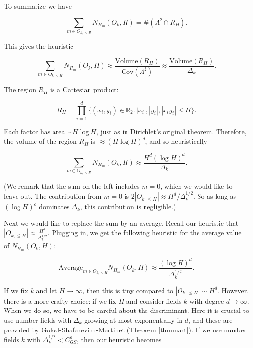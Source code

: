 \documentclass{amsart}
\newcommand{\RR}{\mathbb{R}}
\newcommand{\heur}{\approx}
\newcommand{\Average}{\textrm{Average}}
\newcommand{\Volume}{\textrm{Volume}}
\newcommand{\Cov}{\textrm{Cov}}
\begin{document}
To summarize we have

\begin{equation} \label{useRH}
\sum_{m \in O_{k, \le H} } N_{H_m}(O_k, H) = \# (\Lambda^2 \cap R_H).
\end{equation}

This gives the heuristic

\begin{equation} \label{heurgn}
\sum_{m \in O_{k, \le H} } N_{H_m}(O_k, H) \heur \frac{ \Volume(R_H)} {\Cov(\Lambda^2)} \approx \frac{ \Volume(R_H)} {\Delta_k}. 
\end{equation}

The region $R_H$ is a Cartesian product: 

$$ R_H = \prod_{i=1}^d \{ (x_i, y_i) \in \RR_2: |x_i|, |y_i|, |x_i y_i| \le H \}. $$

\noindent Each factor has area $\sim H \log H$,  just as in Dirichlet's original theorem.    Therefore,  the volume of the region $R_H$ is $\approx (H \log H)^d$,  and so heuristically 

\begin{equation} \label{heurgn}
\sum_{m \in O_{k, \le H} } N_{H_m}(O_k, H) \heur \frac{H^d (\log H)^d}  {\Delta_k}. 
\end{equation}

(We remark that the sum on the left includes $m=0$,  which we would like to leave out.   The contribution from $m=0$ is $2 |O_{k, \le H}| \approx H^d / \Delta_k^{1/2}$.  So as long as $(\log H)^d$ dominates $\Delta_k$,  this contribution is negligible.)

Next we would like to replace the sum by an average.   Recall our heuristic that $|O_{k, \le H}| \heur \frac{ H^d}{\Delta_k^{1/2}}$.    Plugging in, we get the following heuristic for the average value of $N_{H_m}(O_k, H)$:

$$ \Average_{m \in O_{k, \le H} } N_{H_m}(O_k,H) \heur \frac{ (\log H)^d }{\Delta_k^{1/2}}. $$

If we fix $k$ and let $H \rightarrow \infty$,  then this is tiny compared to $|O_{k, \le H}| \sim H^d$.   However,  there is a more crafty choice: if we fix $H$ and consider fields $k$ with degree $d \rightarrow \infty$.   When we do so,  we have to be careful about the discriminant.    Here it is crucial to use number fields with $\Delta_k$ growing at most exponentially in $d$,  and these are provided by Golod-Shafarevich-Martinet (Theorem \ref{thmmart}).  If we use number fields $k$ with $\Delta_k^{1/2} < C_{GS}^d$,  then our heuristic becomes
\end{document}
